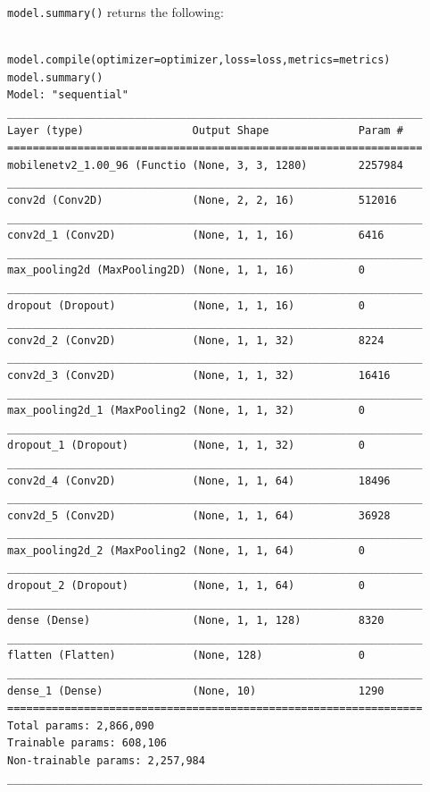 \documentclass[12pt, letterpaper]{article}
\begin{document}
\texttt{model.summary()} returns the following:

\begin{mdframed}[backgroundcolor=bg]
\begin{lstlisting}

model.compile(optimizer=optimizer,loss=loss,metrics=metrics)
model.summary()
Model: "sequential"
_________________________________________________________________
Layer (type)                 Output Shape              Param #   
=================================================================
mobilenetv2_1.00_96 (Functio (None, 3, 3, 1280)        2257984   
_________________________________________________________________
conv2d (Conv2D)              (None, 2, 2, 16)          512016    
_________________________________________________________________
conv2d_1 (Conv2D)            (None, 1, 1, 16)          6416      
_________________________________________________________________
max_pooling2d (MaxPooling2D) (None, 1, 1, 16)          0         
_________________________________________________________________
dropout (Dropout)            (None, 1, 1, 16)          0         
_________________________________________________________________
conv2d_2 (Conv2D)            (None, 1, 1, 32)          8224      
_________________________________________________________________
conv2d_3 (Conv2D)            (None, 1, 1, 32)          16416     
_________________________________________________________________
max_pooling2d_1 (MaxPooling2 (None, 1, 1, 32)          0         
_________________________________________________________________
dropout_1 (Dropout)          (None, 1, 1, 32)          0         
_________________________________________________________________
conv2d_4 (Conv2D)            (None, 1, 1, 64)          18496     
_________________________________________________________________
conv2d_5 (Conv2D)            (None, 1, 1, 64)          36928     
_________________________________________________________________
max_pooling2d_2 (MaxPooling2 (None, 1, 1, 64)          0         
_________________________________________________________________
dropout_2 (Dropout)          (None, 1, 1, 64)          0         
_________________________________________________________________
dense (Dense)                (None, 1, 1, 128)         8320      
_________________________________________________________________
flatten (Flatten)            (None, 128)               0         
_________________________________________________________________
dense_1 (Dense)              (None, 10)                1290      
=================================================================
Total params: 2,866,090
Trainable params: 608,106
Non-trainable params: 2,257,984
_________________________________________________________________
\end{lstlisting}
\end{mdframed}
\end{document}

